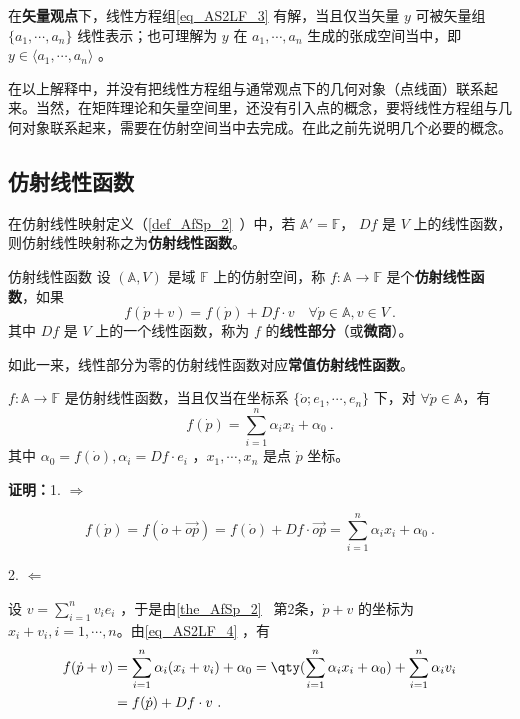 在\textbf{矢量观点}下，线性方程组\autoref{eq_AS2LF_3} 有解，当且仅当矢量 $y$ 可被矢量组 $\{a_1,\cdots,a_n\}$ 线性表示；也可理解为 $y$ 在 $a_1,\cdots,a_n$ 生成的张成空间当中，即$y\in\langle a_1,\cdots,a_n\rangle$ 。

在以上解释中，并没有把线性方程组与通常观点下的几何对象（点线面）联系起来。当然，在矩阵理论和矢量空间里，还没有引入点的概念，要将线性方程组与几何对象联系起来，需要在仿射空间当中去完成。在此之前先说明几个必要的概念。
\subsection{仿射线性函数}
在仿射线性映射定义（\autoref{def_AfSp_2}~）中，若 $\mathbb A'=\mathbb F$， $Df$ 是 $V$ 上的线性函数，则仿射线性映射称之为\textbf{仿射线性函数}。
\begin{definition}{仿射线性函数}
设 $(\mathbb A,V)$ 是域 $\mathbb {F}$ 上的仿射空间，称 $f:\mathbb A\rightarrow \mathbb F$ 是个\textbf{仿射线性函数}，如果
\begin{equation}
f(\dot p+v)=f(\dot p)+Df\cdot v\quad\forall \dot p\in\mathbb A,v\in V~.
\end{equation}
其中 $Df$ 是 $V$ 上的一个线性函数，称为 $f$ 的\textbf{线性部分}（或\textbf{微商}）。
\end{definition}
如此一来，线性部分为零的仿射线性函数对应\textbf{常值仿射线性函数}。
\begin{theorem}{}\label{the_AS2LF_1}
 $f:\mathbb A\rightarrow \mathbb F$ 是仿射线性函数，当且仅当在坐标系 $\{\dot o;e_1,\cdots,e_n\}$ 下，对 $\forall \dot p\in \mathbb A$，有
 \begin{equation}\label{eq_AS2LF_4}
 f(\dot p)=\sum_{i=1}^n\alpha_ix_i+\alpha_0~.
 \end{equation}
 其中 $\alpha_0=f(\dot o),\alpha_i=Df\cdot e_i$ ，$x_1,\cdots,x_n$ 是点 $\dot p$ 坐标。
\end{theorem}
\textbf{证明：}1. $\Rightarrow$

\begin{equation}
f(\dot p)=f(\dot o+\vec{op})=f(\dot o)+Df\cdot \vec{op}=\sum_{i=1}^n \alpha_i x_i+\alpha_0~.
\end{equation}

2. $\Leftarrow$

设 $v=\sum\limits_{i=1}^n v_ie_i$ ，于是由\autoref{the_AfSp_2}~ 第2条，$\dot p+v$ 的坐标为 $x_i+v_i,i=1,\cdots ,n$。由\autoref{eq_AS2LF_4} ，有
\begin{equation}
\begin{aligned}
f(\dot p+v)&=\sum_{i=1}^n\alpha_i(x_i+v_i)+\alpha_0=\qty(\sum_{i=1}^n\alpha_i x_i+\alpha_0)+\sum_{i=1}^n\alpha_i v_i\\
&=f(\dot p)+Df\cdot v~.
\end{aligned}
\end{equation}

